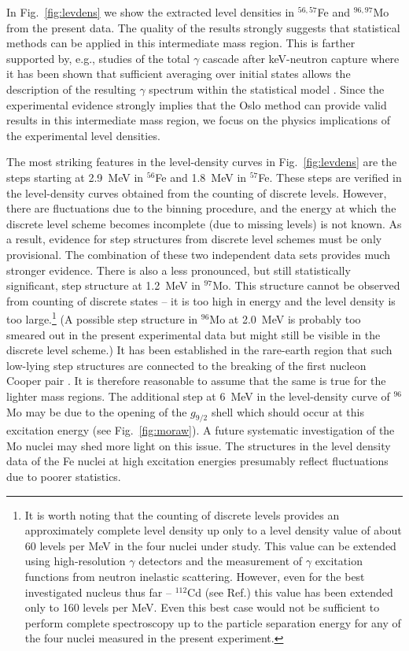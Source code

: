 \begin{multicols}{2}
In Fig.\ \ref{fig:levdens} we show the extracted level densities in 
$^{56,57}$Fe and $^{96,97}$Mo from the present data. The quality of the results
strongly suggests that statistical methods can be applied in this intermediate 
mass region. This is farther supported by, e.g., studies of the total $\gamma$ 
cascade after keV-neutron capture where it has been shown that sufficient 
averaging over initial states allows the description of the resulting $\gamma$ 
spectrum within the statistical model \cite{IM88}. Since the experimental 
evidence strongly implies that the Oslo method can provide valid results in 
this intermediate mass region, we focus on the physics implications of the 
experimental level densities.

The most striking features in the level-density curves in Fig.\ 
\ref{fig:levdens} are the steps starting at 2.9~MeV in $^{56}$Fe and 1.8~MeV in
$^{57}$Fe. These steps are verified in the level-density curves obtained from 
the counting of discrete levels. However, there are fluctuations due to the 
binning procedure, and the energy at which the discrete level scheme becomes 
incomplete (due to missing levels) is not known. As a result, evidence for step
structures from discrete level schemes must be only provisional. The 
combination of these two independent data sets provides much stronger evidence.
There is also a less pronounced, but still statistically significant, step 
structure at 1.2~MeV in $^{97}$Mo. This structure cannot be observed from 
counting of discrete states -- it is too high in energy and the level density 
is too large.\footnote{It is worth noting that the counting of discrete levels 
provides an approximately complete level density up only to a level density 
value of about 60 levels per MeV in the four nuclei under study. This value can
be extended using high-resolution $\gamma$ detectors and the measurement of 
$\gamma$ excitation functions from neutron inelastic scattering. However, even
for the best investigated nucleus thus far -- $^{112}$Cd (see Ref.\cite{GL01}) 
this value has been extended only to 160 levels per MeV\@. Even this best case 
would not be sufficient to perform complete spectroscopy up to the particle 
separation energy for any of the four nuclei measured in the present 
experiment.} (A possible step structure in $^{96}$Mo at 2.0~MeV is probably too
smeared out in the present experimental data but might still be visible in the 
discrete level scheme.) It has been established in the rare-earth region that 
such low-lying step structures are connected to the breaking of the first 
nucleon Cooper pair \cite{MB99}. It is therefore reasonable to assume that the 
same is true for the lighter mass regions. The additional step at 6~MeV in the 
level-density curve of $^{96}$Mo may be due to the opening of the $g_{9/2}$ 
shell which should occur at this excitation energy (see Fig.\ \ref{fig:moraw}).
A future systematic investigation of the Mo nuclei may shed more light on this 
issue. The structures in the level density data of the Fe nuclei at high 
excitation energies presumably reflect fluctuations due to poorer statistics.


\end{multicols}
